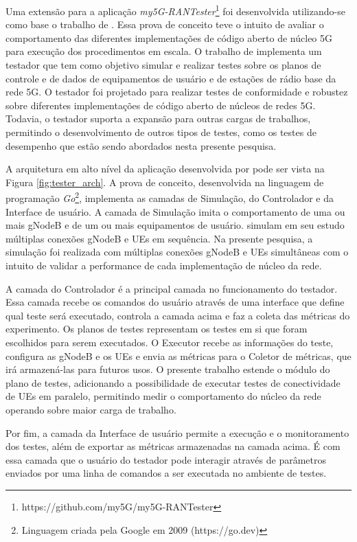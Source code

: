 Uma extensão para a aplicação \textit{my5G-RANTester}\footnote{https://github.com/my5G/my5G-RANTester} foi desenvolvida utilizando-se como base o trabalho de .
Essa prova de conceito teve o intuito de avaliar o comportamento das diferentes implementações de código aberto de núcleo 5G para execução dos procedimentos em escala.
O trabalho de  implementa um testador que tem como objetivo simular e realizar testes sobre os planos de controle e de dados de equipamentos de usuário e de estações de rádio base da rede 5G.
O testador foi projetado para realizar testes de conformidade e robustez sobre diferentes implementações de código aberto de núcleos de redes 5G.
Todavia, o testador suporta a expansão para outras cargas de trabalhos, permitindo o desenvolvimento de outros tipos de testes, como os testes de desempenho que estão sendo abordados nesta presente pesquisa.

A arquitetura em alto nível da aplicação desenvolvida por  pode ser vista na Figura \ref{fig:tester_arch}.
A prova de conceito, desenvolvida na linguagem de programação \textit{Go}\footnote{Linguagem criada pela Google em 2009 (https://go.dev)}, implementa as camadas de Simulação, do Controlador e da Interface de usuário.
A camada de Simulação imita o comportamento de uma ou mais gNodeB e de um ou mais equipamentos de usuário.
 simulam em seu estudo múltiplas conexões gNodeB e UEs em sequência. Na presente pesquisa, a simulação foi realizada com múltiplas conexões gNodeB e UEs simultâneas com o intuito de validar a performance de cada implementação de núcleo da rede.

A camada do Controlador é a principal camada no funcionamento do testador. Essa camada recebe os comandos do usuário através de uma interface que define qual teste será executado, controla a camada acima e faz a coleta das métricas do experimento.
Os planos de testes representam os testes em si que foram escolhidos para serem executados. O Executor recebe as informações do teste, configura as gNodeB e os UEs e envia as métricas para o Coletor de métricas, que irá armazená-las para futuros usos.
O presente trabalho estende o módulo do plano de testes, adicionando a possibilidade de executar testes de conectividade de UEs em paralelo, permitindo medir o comportamento do núcleo da rede operando sobre maior carga de trabalho.

Por fim, a camada da Interface de usuário permite a execução e o monitoramento dos testes, além de exportar as métricas armazenadas na camada acima. É com essa camada que o usuário do testador pode interagir através de parâmetros enviados por uma linha de comandos a ser executada no ambiente de testes.


